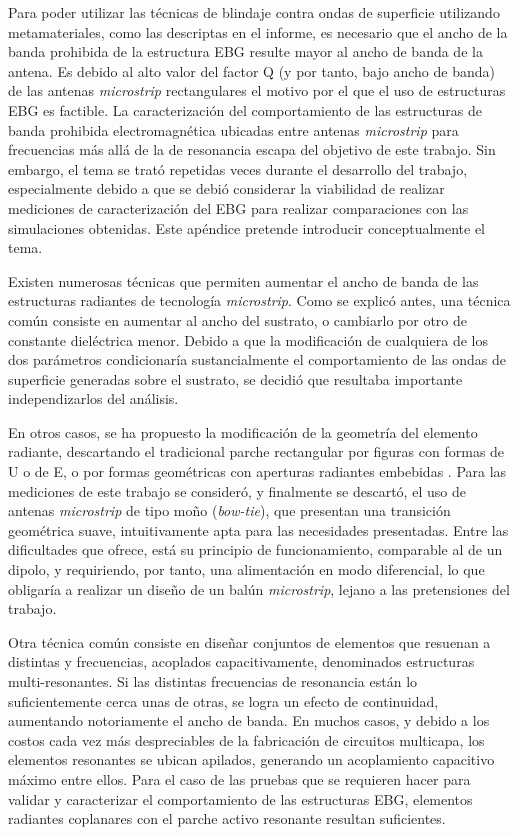 Para poder utilizar las técnicas de blindaje contra ondas de superficie utilizando metamateriales, como las descriptas en el informe, es necesario que el ancho de la banda prohibida de la estructura EBG resulte mayor al ancho de banda de la antena. Es debido al alto valor del factor Q (y por tanto, bajo ancho de banda) de las antenas \textit{microstrip} rectangulares el motivo por el que el uso de estructuras EBG es factible.
La caracterización del comportamiento de las estructuras de banda prohibida electromagnética ubicadas entre antenas \textit{microstrip} para frecuencias más allá de la de resonancia escapa del objetivo de este trabajo. Sin embargo, el tema se trató repetidas veces durante el desarrollo del trabajo, especialmente debido a que se debió considerar la viabilidad de realizar mediciones de caracterización del EBG para realizar comparaciones con las simulaciones obtenidas. Este apéndice pretende introducir conceptualmente el tema.

Existen numerosas técnicas que permiten aumentar el ancho de banda de las estructuras radiantes de tecnología \textit{microstrip}. Como se explicó antes, una técnica común consiste en aumentar al ancho del sustrato, o cambiarlo por otro de constante dieléctrica menor. Debido a que la modificación de cualquiera de los dos parámetros condicionaría sustancialmente el comportamiento de las ondas de superficie generadas sobre el sustrato, se decidió que resultaba importante independizarlos del análisis.

En otros casos, se ha propuesto la modificación de la geometría del elemento radiante, descartando el tradicional parche rectangular por figuras con formas de U o de E, o por formas geométricas con aperturas radiantes embebidas \cite{Yang:EBGAntennas}. Para las mediciones de este trabajo se consideró, y finalmente se descartó, el uso de antenas \textit{microstrip} de tipo moño (\textit{bow-tie}), que presentan una transición geométrica suave, intuitivamente apta para las necesidades presentadas. Entre las dificultades que ofrece, está su principio de funcionamiento, comparable al de un dipolo, y requiriendo, por tanto, una alimentación en modo diferencial, lo que obligaría a realizar un diseño de un balún \textit{microstrip}, lejano a las pretensiones del trabajo.

Otra técnica común consiste en diseñar conjuntos de elementos que resuenan a distintas y frecuencias, acoplados capacitivamente, denominados estructuras multi-resonantes. Si las distintas frecuencias de resonancia están lo suficientemente cerca unas de otras, se logra un efecto de continuidad, aumentando notoriamente el ancho de banda. En muchos casos, y debido a los costos cada vez más despreciables de la fabricación de circuitos multicapa, los elementos resonantes se ubican apilados, generando un acoplamiento capacitivo máximo entre ellos. Para el caso de las pruebas que se requieren hacer para validar y caracterizar el comportamiento de las estructuras EBG, elementos radiantes coplanares con el parche activo resonante resultan suficientes.

